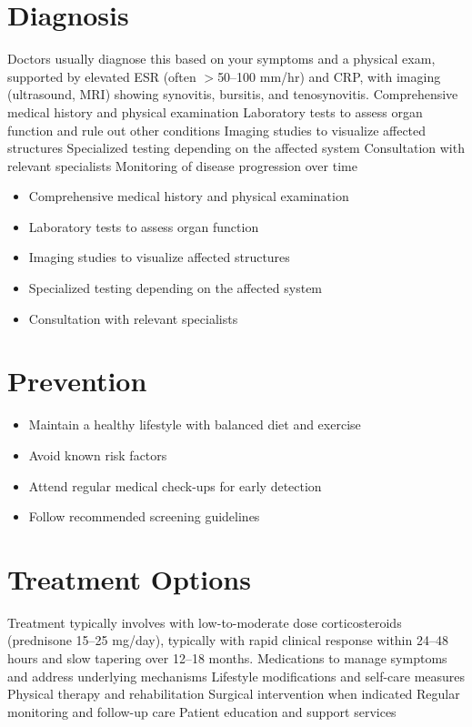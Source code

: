 \section{Diagnosis}
Doctors usually diagnose this based on your symptoms and a physical exam, supported by elevated ESR (often $>$50--100 mm/hr) and CRP, with imaging (ultrasound, MRI) showing synovitis, bursitis, and tenosynovitis. Comprehensive medical history and physical examination Laboratory tests to assess organ function and rule out other conditions Imaging studies to visualize affected structures Specialized testing depending on the affected system Consultation with relevant specialists Monitoring of disease progression over time

\begin{itemize}[noitemsep]
  \item Comprehensive medical history and physical examination
  \item Laboratory tests to assess organ function
  \item Imaging studies to visualize affected structures
  \item Specialized testing depending on the affected system
  \item Consultation with relevant specialists
\end{itemize}
\section{Prevention}
\begin{itemize}[noitemsep]
  \item Maintain a healthy lifestyle with balanced diet and exercise
  \item Avoid known risk factors
  \item Attend regular medical check-ups for early detection
  \item Follow recommended screening guidelines
\end{itemize}
\section{Treatment Options}
Treatment typically involves with low-to-moderate dose corticosteroids (prednisone 15--25 mg/day), typically with rapid clinical response within 24--48 hours and slow tapering over 12--18 months. Medications to manage symptoms and address underlying mechanisms Lifestyle modifications and self-care measures Physical therapy and rehabilitation Surgical intervention when indicated Regular monitoring and follow-up care Patient education and support services

